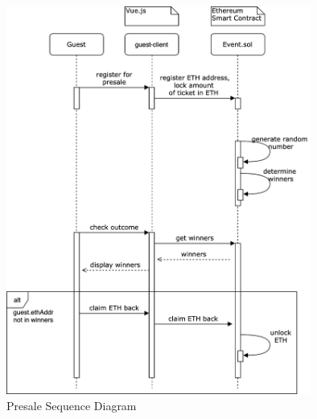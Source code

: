 \begin{figure}[H]
    \centering
    \includegraphics[width=10cm]{design/diagrams/presale.png}
    \caption{Presale Sequence Diagram}
    \label{fig:presale-seuquence-diagram}
\end{figure}

